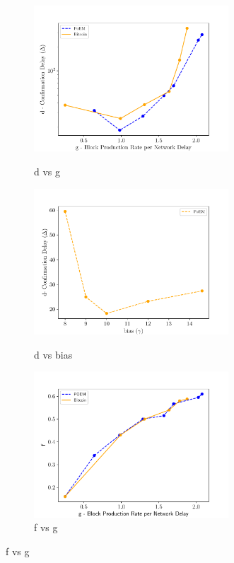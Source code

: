 \begin{figure}
    \centering
    \begin{subfigure}{0.49\textwidth}
    \centering
    \caption{d vs g}
    \includegraphics[width = 0.8\textwidth]{figures/dvsg.pdf}
    \label{fig:dvsg}
    \end{subfigure}
    \begin{subfigure}{0.49\textwidth}
    \centering
    \caption{d vs bias}
    \includegraphics[width = 0.8\textwidth]{figures/gamma.pdf}
    \label{fig:bias}
    \end{subfigure}
    \begin{subfigure}{0.49\textwidth}
    \centering
    \caption{f vs g}
    \includegraphics[width = 0.8\textwidth]{figures/fvg.pdf}

\end{subfigure}
\end{figure}

